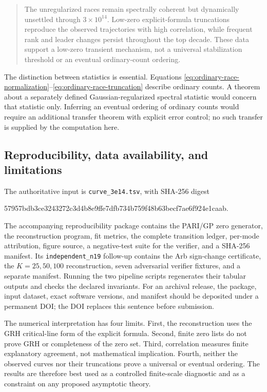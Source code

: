 \begin{quote}
The unregularized races remain spectrally coherent but dynamically unsettled
through $3\times10^{14}$.  Low-zero explicit-formula truncations reproduce the
observed trajectories with high correlation, while frequent rank and leader
changes persist throughout the top decade.  These data support a low-zero
transient mechanism, not a universal stabilization threshold or an eventual
ordinary-count ordering.
\end{quote}

The distinction between statistics is essential.  Equations
\eqref{eq:ordinary-race-normalization}--\eqref{eq:ordinary-race-truncation}
describe ordinary counts.  A theorem about a separately defined
Gaussian-regularized spectral statistic would concern that statistic only.
Inferring an eventual ordering of ordinary counts would require an additional
transfer theorem with explicit error control; no such transfer is supplied by
the computation here.

\subsection{Reproducibility, data availability, and limitations}

The authoritative input is \texttt{curve\_3e14.tsv}, with SHA-256 digest
\begin{center}
\ttfamily\footnotesize
57957bdb3ce3243272c3d4b8e9ffe7dfb734b759f48b63becf7ae6f924e1caab.
\end{center}
The accompanying reproducibility package contains the PARI/GP zero generator,
the reconstruction program, fit metrics, the complete transition ledger,
per-mode attribution, figure source, a negative-test suite for the verifier,
and a SHA-256 manifest.  Its \texttt{independent\_n19} follow-up contains the
Arb sign-change certificate, the $K=25,50,100$ reconstruction, seven
adversarial verifier fixtures, and a separate manifest.  Running the two
pipeline scripts regenerates their tabular outputs and checks the declared
invariants.  For an
archival release, the package, input dataset, exact software versions, and
manifest should be deposited under a permanent DOI; the DOI replaces this
sentence before submission.

The numerical interpretation has four limits.  First, the reconstruction uses
the GRH critical-line form of the explicit formula.  Second, finite zero lists
do not prove GRH or completeness of the zero set.  Third, correlation measures
finite explanatory agreement, not mathematical implication.  Fourth, neither
the observed curves nor their truncations prove a universal or eventual
ordering.  The results are therefore best used as a controlled finite-scale
diagnostic and as a constraint on any proposed asymptotic theory.
